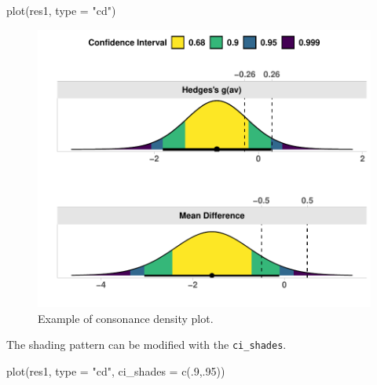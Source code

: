\documentclass[]{interact}
\theoremstyle{plain}%
\theoremstyle{definition}
\theoremstyle{remark}
\newenvironment{Shaded}{\begin{snugshade}}{\end{snugshade}}
\newcommand{\AttributeTok}[1]{\textcolor[rgb]{0.77,0.63,0.00}{#1}}
\newcommand{\DecValTok}[1]{\textcolor[rgb]{0.00,0.00,0.81}{#1}}
\newcommand{\FunctionTok}[1]{\textcolor[rgb]{0.00,0.00,0.00}{#1}}
\newcommand{\NormalTok}[1]{#1}
\newcommand{\StringTok}[1]{\textcolor[rgb]{0.31,0.60,0.02}{#1}}
\begin{document}
\begin{Shaded}
\begin{Highlighting}[]
\FunctionTok{plot}\NormalTok{(res1, }\AttributeTok{type =} \StringTok{"cd"}\NormalTok{)}
\end{Highlighting}
\end{Shaded}

\begin{figure}
\centering
\includegraphics{Avocado_Update_files/figure-latex/cdplot-1.pdf}
\caption{Example of consonance density plot.}
\end{figure}

\newpage

The shading pattern can be modified with the \texttt{ci\_shades}.

\begin{Shaded}
\begin{Highlighting}[]
\FunctionTok{plot}\NormalTok{(res1, }\AttributeTok{type =} \StringTok{"cd"}\NormalTok{,}
     \AttributeTok{ci\_shades =} \FunctionTok{c}\NormalTok{(.}\DecValTok{9}\NormalTok{,.}\DecValTok{95}\NormalTok{))}
\end{Highlighting}
\end{Shaded}
\end{document}
